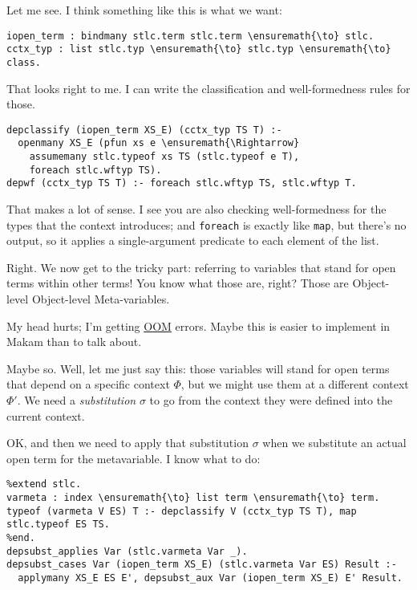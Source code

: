 \heroSTUDENT{} Let me see. I think something like this is what we want:

\begin{verbatim}
iopen_term : bindmany stlc.term stlc.term \ensuremath{\to} stlc.
cctx_typ : list stlc.typ \ensuremath{\to} stlc.typ \ensuremath{\to} class.
\end{verbatim}

\heroADVISOR{} That looks right to me. I can write the classification and
well-formedness rules for those.

\begin{verbatim}
depclassify (iopen_term XS_E) (cctx_typ TS T) :-
  openmany XS_E (pfun xs e \ensuremath{\Rightarrow}
    assumemany stlc.typeof xs TS (stlc.typeof e T),
    foreach stlc.wftyp TS).
depwf (cctx_typ TS T) :- foreach stlc.wftyp TS, stlc.wftyp T.
\end{verbatim}

\heroSTUDENT{} That makes a lot of sense. I see you are also checking
well-formedness for the types that the context introduces; and
\texttt{foreach} is exactly like \texttt{map}, but there's no output, so
it applies a single-argument predicate to each element of the list.

\heroADVISOR{} Right. We now get to the tricky part: referring to variables
that stand for open terms within other terms! You know what those are,
right? Those are Object-level Object-level Meta-variables.

\heroSTUDENT{} My head hurts; I'm getting
\href{https://en.wikipedia.org/wiki/Out_of_memory}{OOM} errors. Maybe
this is easier to implement in Makam than to talk about.

\heroADVISOR{} Maybe so. Well, let me just say this: those variables will
stand for open terms that depend on a specific context \(\Phi\), but we
might use them at a different context \(\Phi'\). We need a
\emph{substitution} \(\sigma\) to go from the context they were defined
into the current context.

\heroSTUDENT{} OK, and then we need to apply that substitution \(\sigma\) when
we substitute an actual open term for the metavariable. I know what to
do:

\vspace{-0.5em}

\begin{verbatim}
%extend stlc.
varmeta : index \ensuremath{\to} list term \ensuremath{\to} term.
typeof (varmeta V ES) T :- depclassify V (cctx_typ TS T), map stlc.typeof ES TS.
%end.
depsubst_applies Var (stlc.varmeta Var _).
depsubst_cases Var (iopen_term XS_E) (stlc.varmeta Var ES) Result :-
  applymany XS_E ES E', depsubst_aux Var (iopen_term XS_E) E' Result.
\end{verbatim}

